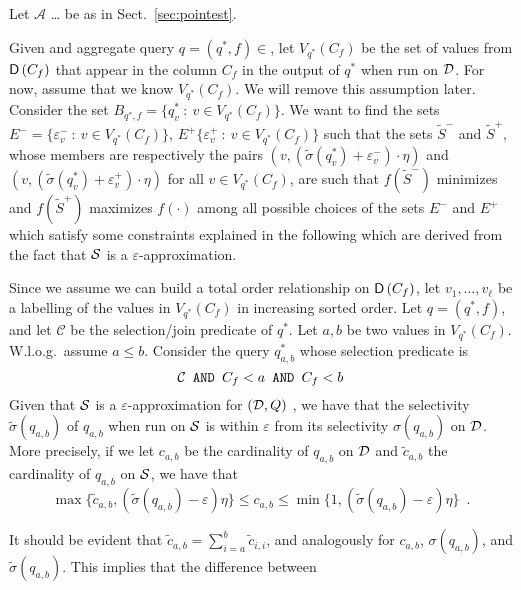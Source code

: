 Let $\mathcal{A}$ \ldots {} be as in
Sect.~\ref{sec:pointest}.

Given and aggregate query $q=(q^*,f)\in$, let $V_{q^*}(C_f)$ be
the set of values from $\mathsf{D}\left(C_f\right)$ that appear in the column $C_f$ in the
output of $q^*$ when run on ${\cal D}$. For now, assume that we know $V_{q^*}(C_f)$.
We will remove this assumption later. Consider the set
$B_{q^*,f}=\{q^*_v ~:~ v\in V_{q^*}(C_f)\}$. We want to find the sets
$E^-=\{\varepsilon^-_v ~:~ v\in V_{q^*}(C_f)\}$, $E^+\{\varepsilon^+_v ~:~ v\in
V_{q^*}(C_f)\}$ %
such that the sets $\tilde{S}^-$ and $\tilde{S}^+$, whose members are
respectively the pairs
$(v,(\tilde\sigma(q^*_v)+\varepsilon^-_v)\cdot\eta)$ and
$(v,(\tilde\sigma(q^*_v)+\varepsilon^+_v)\cdot\eta)$ for all $v\in
V_{q^*}(C_f)$, are such that $f(\tilde{S}^-)$ minimizes and $f(\tilde{S}^+)$
maximizes $f(\cdot)$ among all possible choices of the sets $E^-$ and $E^+$
which satisfy some constraints explained in the following which are derived from
the fact that ${\cal S}$ is a $\varepsilon$-approximation.


Since we assume we can build a total order relationship on $\mathsf{D}\left(C_f\right)$, let
$v_1,\dotsc,v_\ell$ be a labelling of the values in $V_{q^*}(C_f)$ in increasing
sorted order. Let $q=(q^*,f)$, and let $\mathcal{C}$ be the selection/join
predicate of $q^*$. Let $a,b$ be two values in $V_{q^*}(C_f)$. W.l.o.g.~assume
$a\le b$. Consider the query $q^*_{a,b}$ whose selection predicate is
\[
\mathcal{C} \mbox{\texttt{ AND }} C_f < a \mbox{\texttt{ AND }} C_f < b
\]
Given that ${\cal S}$ is a $\varepsilon$-approximation for $({\cal D},Q)$ , we have that the selectivity $\tilde\sigma(q_{a,b})$ of $q_{a,b}$ when run on ${\cal S}$ is within
$\varepsilon$ from its selectivity $\sigma(q_{a,b})$ on ${\cal D}$. More precisely,
if we let $c_{a,b}$ be the cardinality of $q_{a,b}$ on ${\cal D}$ and $\tilde c_{a,b}$ the cardinality of
$q_{a,b}$ on ${\cal S}$, we have that
\[
\max\{\tilde c_{a,b},(\tilde\sigma(q_{a,b})-\varepsilon)\eta\} \le c_{a,b}\le
\min\{1, (\tilde\sigma(q_{a,b})-\varepsilon)\eta\}\enspace.\]

It should be evident that $\tilde c_{a,b}=\sum_{i=a}^b \tilde c_{i,i}$, and analogously for
$c_{a,b}$, $\sigma(q_{a,b})$, and $\tilde\sigma(q_{a,b})$. This implies that the
difference between 

